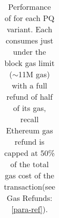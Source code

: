 \begin{table}[t]
\begin{tabular} {|>{\centering}m{3.5cm} |>{\centering}m{0.5cm} |>{\centering}m{1.5cm} |>{\centering}m{1.8cm} |>{\centering\arraybackslash}m{1.5cm}|}
\end{tabular}
\caption{\footnotesize{Performance of \cm for each PQ variant. Each consumes just under the block gas limit ($\sim$11M gas) with a full refund of half of its gas, recall Ethereum gas refund is capped at 50\% of the total gas cost of the transaction(see Gas Refunds:\ref{para-ref})}.\label{tab:worst_case_matching}}





\end{table}


